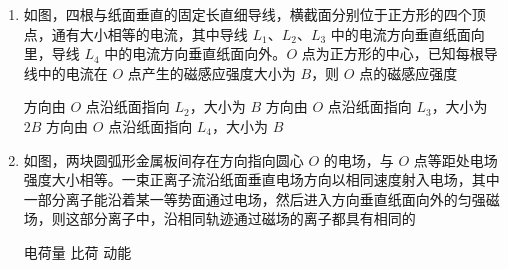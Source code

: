 \documentclass[\gkver]{gaokaozhenti}
\begin{document}
\begin{enumerate}
\item
如图，四根与纸面垂直的固定长直细导线，横截面分别位于正方形的四个顶点，通有大小相等的电流，其中导线 $L_{1}$、$L_{2}$、$L_{3}$ 中的电流方向垂直纸面向里，导线 $L_{4}$ 中的电流方向垂直纸面向外。$O$ 点为正方形的中心，已知每根导线中的电流在 $O$ 点产生的磁感应强度大小为 $B$，则 $O$ 点的磁感应强度


{方向由 $O$ 点沿纸面指向 $L_{2}$，大小为 $B$}
{方向由 $O$ 点沿纸面指向 $L_{3}$，大小为 $2B$}
{方向由 $O$ 点沿纸面指向 $L_{4}$，大小为 $B$}


\item
如图，两块圆弧形金属板间存在方向指向圆心 $O$ 的电场，与 $O$ 点等距处电场强度大小相等。一束正离子流沿纸面垂直电场方向以相同速度射入电场，其中一部分离子能沿着某一等势面通过电场，然后进入方向垂直纸面向外的匀强磁场，则这部分离子中，沿相同轨迹通过磁场的离子都具有相同的


{电荷量}
{比荷}
{动能}



\end{enumerate}
\end{document}
